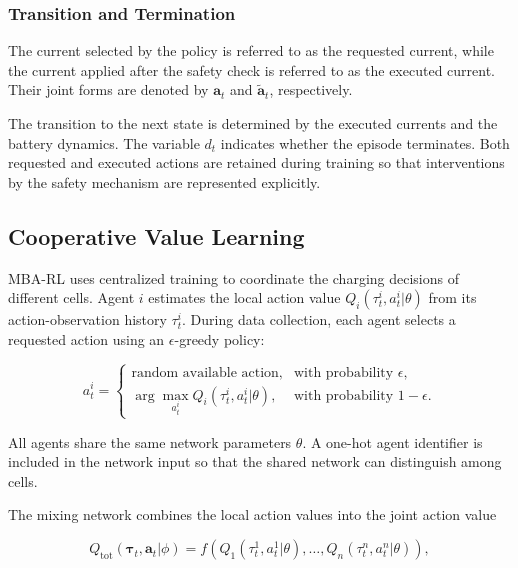 \subsubsection{Transition and Termination}

The current selected by the policy is referred to as the requested current, while the current applied after the safety check is referred to as the executed current. Their joint forms are denoted by $\mathbf{a}_t$ and $\tilde{\mathbf{a}}_t$, respectively.

The transition to the next state is determined by the executed currents and the battery dynamics. The variable $d_t$ indicates whether the episode terminates. Both requested and executed actions are retained during training so that interventions by the safety mechanism are represented explicitly.

\subsection{Cooperative Value Learning}

MBA-RL uses centralized training to coordinate the charging decisions of different cells. Agent $i$ estimates the local action value $Q_i(\tau_t^i,a_t^i|\theta)$ from its action-observation history $\tau_t^i$. During data collection, each agent selects a requested action using an $\epsilon$-greedy policy:

\begin{equation}
\label{epsilon-greedy}
a_t^i =
\begin{cases}
\text{random available action},
& \text{with probability }\epsilon,\\
\displaystyle
\arg\max_{a_t^i}
Q_i(\tau_t^i,a_t^i|\theta),
& \text{with probability }1-\epsilon.
\end{cases}
\end{equation}

All agents share the same network parameters $\theta$. A one-hot agent identifier is included in the network input so that the shared network can distinguish among cells.

The mixing network combines the local action values into the joint action value

\begin{equation}
\label{Q-value}
Q_{\mathrm{tot}}
(\boldsymbol{\tau}_t,\mathbf{a}_t|\phi)
=
f\left(
Q_1(\tau_t^1,a_t^1|\theta),
\ldots,
Q_n(\tau_t^n,a_t^n|\theta)
\right),
\end{equation}


